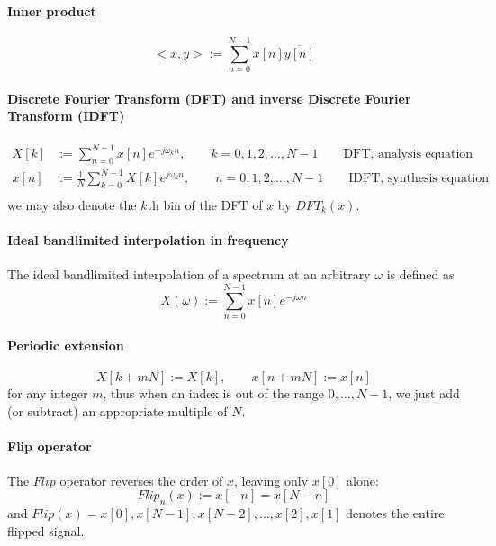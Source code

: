 \paragraph{Inner product}
\begin{equation}
  <x, y> := \sum_{n=0}^{N-1} x[n] \overline{y[n]}
\end{equation}

\paragraph{Discrete Fourier Transform (DFT) and inverse Discrete Fourier Transform (IDFT)}
\begin{equation}
 \begin{aligned}
  X[k] & :=             \sum_{n=0}^{N-1} x[n] e^{-j \omega_k n}, \qquad k = 0, 1, 2, \ldots, N-1 \qquad \text{DFT, analysis equation}    \\
  x[n] & := \frac{1}{N} \sum_{k=0}^{N-1} X[k] e^{ j \omega_k n}, \qquad n = 0, 1, 2, \ldots, N-1 \qquad \text{IDFT, synthesis equation}  \\
 \end{aligned}
\end{equation}
we may also denote the $k$th bin of the DFT of $x$ by $DFT_k(x)$.

\paragraph{Ideal bandlimited interpolation in frequency}
The ideal bandlimited interpolation of a spectrum at an arbitrary $\omega$ is defined as
\begin{equation}
  X(\omega) :=  \sum_{n=0}^{N-1} x[n] e^{-j \omega n}
\end{equation}

\paragraph{Periodic extension}
\begin{equation}
  X[k+mN] := X[k], \qquad x[n+mN] := x[n]
\end{equation}
for any integer $m$, thus when an index is out of the range $0, \ldots, N-1$, we just add (or subtract) an appropriate multiple of $N$.

\paragraph{Flip operator}
The $Flip$ operator reverses the order of $x$, leaving only $x[0]$ alone:
\begin{equation}
  Flip_n(x) := x[-n] = x[N-n]
\end{equation}
and $Flip(x) =  x[0], x[N-1], x[N-2], \ldots, x[2], x[1]$ denotes the entire flipped signal.

